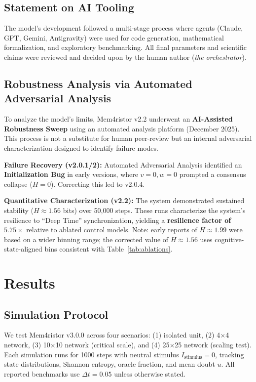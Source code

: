 \documentclass[11pt]{article}
\begin{document}
\subsection{Statement on AI Tooling}
The model's development followed a multi-stage process where agents (Claude, GPT, Gemini, Antigravity) were used for code generation, mathematical formalization, and exploratory benchmarking. All final parameters and scientific claims were reviewed and decided upon by the human author (\textit{the orchestrator}).

\subsection{Robustness Analysis via Automated Adversarial Analysis}

To analyze the model's limits, Mem4ristor v2.2 underwent an \textbf{AI-Assisted Robustness Sweep} using an automated analysis platform (December 2025). This process is not a substitute for human peer-review but an internal adversarial characterization designed to identify failure modes.

\textbf{Failure Recovery (v2.0.1/2):}
Automated Adversarial Analysis identified an \textbf{Initialization Bug} in early versions, where $v=0, w=0$ prompted a consensus collapse ($H=0$). Correcting this led to v2.0.4.

\textbf{Quantitative Characterization (v2.2):}
The system demonstrated sustained stability ($H \approx 1.56$ bits) over 50,000 steps. These runs characterize the system's resilience to ``Deep Time'' synchronization, yielding a \textbf{resilience factor of $5.75\times$} relative to ablated control models. Note: early reports of $H \approx 1.99$ were based on a wider binning range; the corrected value of $H \approx 1.56$ uses cognitive-state-aligned bins consistent with Table~\ref{tab:ablations}.

\section{Results}

\subsection{Simulation Protocol}

We test Mem4ristor v3.0.0 across four scenarios: (1) isolated unit, (2) 4$\times$4 network, (3) 10$\times$10 network (critical scale), and (4) 25$\times$25 network (scaling test). Each simulation runs for 1000 steps with neutral stimulus $I_{\text{stimulus}} = 0$, tracking state distributions, Shannon entropy, oracle fraction, and mean doubt $u$. All reported benchmarks use $\Delta t = 0.05$ unless otherwise stated.
\end{document}
